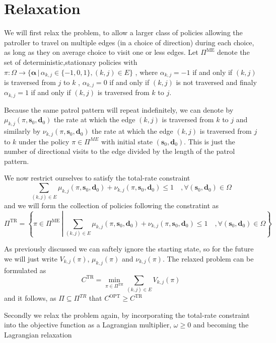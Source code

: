 \documentclass[a4paper,10pt]{article}
\theoremstyle{definition}
\theoremstyle{definition}
\theoremstyle{remark}
\theoremstyle{definition}
\begin{document}
\section{Relaxation}
We will first relax the problem, to allow a larger class of policies allowing the patroller to travel on multiple edges (in a choice of direction) during each choice, as long as they on average choice to visit one or less edges. Let $\Pi^{\text{ME}}$ denote the set of deterministic,stationary policies with $\pi: \Omega \rightarrow \{\bm{\alpha} \, | \, \alpha_{k,j} \in \{-1,0,1 \} , (k,j) \in E \}$ , where $\alpha_{k,j}=-1$ if and only if $(k,j)$ is traversed from $j$ to $k$ , $\alpha_{k,j}=0$ if and only if $(k,j)$ is not traversed and finaly $\alpha_{k,j}=1$ if and only if $(k,j)$ is traversed from $k$ to $j$.

Because the same patrol pattern will repeat indefinitely, we can denote by $\mu_{k,j}(\pi,\bm{s}_{0},\bm{d}_{0})$ the rate at which the edge $(k,j)$ is traversed from $k$ to $j$ and similarly by $\nu_{k,j}(\pi,\bm{s}_{0},\bm{d}_{0})$ the rate at which the edge $(k,j)$ is traversed from $j$ to $k$ under the policy $\pi \in \Pi^{ME}$ with initial state $(\bm{s}_{0},\bm{d}_{0})$. This is just the number of directional visits to the edge divided by the length of the patrol pattern.

We now restrict ourselves to satisfy the total-rate constraint
\begin{equation}
\sum\limits_{(k,j) \in E} \mu_{k,j}(\pi,\bm{s}_{0},\bm{d}_{0}) +\nu_{k,j}(\pi,\bm{s}_{0},\bm{d}_{0}) \leq 1 \quad , \forall (\bm{s}_{0},\bm{d}_{0}) \in \Omega
\end{equation}
and we will form the collection of policies following the constratint as
$$\Pi^{\text{TR}}= \left\{ \pi \in \Pi^{\text{ME}} \, \left| \, \sum\limits_{(k,j) \in E} \mu_{k,j}(\pi,\bm{s}_{0},\bm{d}_{0}) +\nu_{k,j}(\pi,\bm{s}_{0},\bm{d}_{0}) \leq 1 \quad , \forall (\bm{s}_{0},\bm{d}_{0}) \in \Omega \right. \right\}$$

As previously discussed we can saftely ignore the starting state, so for the future we will just write $V_{k,j}(\pi)$, $\mu_{k,j}(\pi)$ and $\nu_{k,j}(\pi)$. The relaxed problem can be formulated as
\begin{equation}
C^{\text{TR}}=\min\limits_{\pi \in \Pi^{TR}} \sum\limits_{(k,j) \in E} V_{k,j}(\pi)
\end{equation}
and it follows, as $\Pi \subseteq \Pi^{TR}$ that $C^{\text{OPT}} \geq C^{\text{TR}}$

Secondly we relax the problem again, by incorporating the total-rate constraint into the objective function as a Lagrangian multiplier, $\omega \geq 0$ and becoming the Lagrangian relaxation
\end{document}
